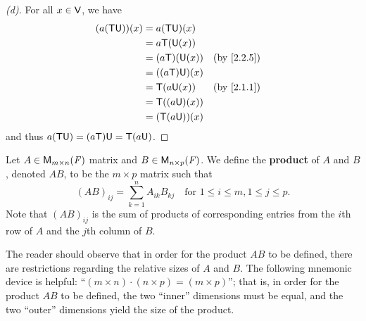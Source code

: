 \begin{proof}[(d)]
  For all \(x \in \mathsf{V}\), we have
  \begin{align*}
    (a (\T \U))(x) & = a (\T \U)(x)                                 \\
                   & = a \T(\U(x))                                  \\
                   & = (a \T)(\U(x))  &  & \text{(by \cref{2.2.5})} \\
                   & = ((a \T) \U)(x)                               \\
                   & = \T(a \U(x))    &  & \text{(by \cref{2.1.1})} \\
                   & = \T((a \U)(x))                                \\
                   & = (\T (a \U))(x)
  \end{align*}
  and thus \(a (\mathsf{T} \mathsf{U}) = (a \mathsf{T}) \mathsf{U} = \mathsf{T} (a \mathsf{U})\).
\end{proof}

\begin{defn}\label{2.3.1}
  Let \(A \in \mathsf{M}_{{m} \times n}({\mathit{F}})\) matrix and \(B \in \mathsf{M}_{{n} \times p}({\mathit{F}})\).
  We define the \textbf{product} of \(A\) and \(B\), denoted \(AB\), to be the \(m \times p\) matrix such that
  \[
    (AB)_{i j} = \sum_{k = 1}^n A_{i k} B_{k j} \quad \text{for } 1 \leq i \leq m, 1 \leq j \leq p.
  \]
  Note that \((AB)_{i j}\) is the sum of products of corresponding entries from the \(i\)th row of \(A\) and the \(j\)th column of \(B\).
\end{defn}

\begin{note}
  The reader should observe that in order for the product \(AB\) to be defined, there are restrictions regarding the relative sizes of \(A\) and \(B\).
  The following mnemonic device is helpful:
  ``\((m \times n) \cdot (n \times p) = (m \times p)\)'';
  that is, in order for the product \(AB\) to be defined, the two ``inner'' dimensions must be equal, and the two ``outer'' dimensions yield the size of the product.
\end{note}


